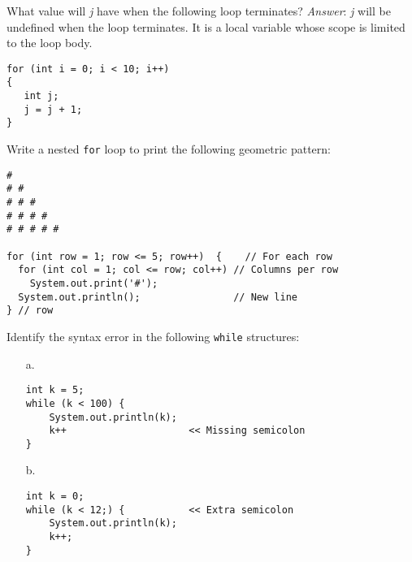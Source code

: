 \begin{ANS}
\item  What value will {\it j} have when the following loop terminates?
{\it Answer}: {\it j} will be undefined when the loop terminates. It
is a local variable whose scope is limited to the loop body.

\begin{jjjlisting}
\begin{lstlisting}[basicstyle=\scriptsize]
for (int i = 0; i < 10; i++)
{
   int j;
   j = j + 1;
}
\end{lstlisting}
\end{jjjlisting}


\item  Write a nested {\tt for} loop to print the following geometric pattern:

\begin{jjjlisting}
\begin{lstlisting}[basicstyle=\scriptsize]
#
# #
# # #
# # # #
# # # # #

for (int row = 1; row <= 5; row++)  {    // For each row
  for (int col = 1; col <= row; col++) // Columns per row
    System.out.print('#');
  System.out.println();                // New line
} // row
\end{lstlisting}
\end{jjjlisting}

\item  Identify the syntax error in the following {\tt while} structures:
\begin{enumerate}\baselineskip=10.5pt

\item[a.]

\begin{jjjlisting}
\begin{lstlisting}[basicstyle=\scriptsize]
int k = 5;
while (k < 100) {
    System.out.println(k);
    k++                     << Missing semicolon
}
\end{lstlisting}
\end{jjjlisting}

\item[b.]

\begin{jjjlisting}
\begin{lstlisting}[basicstyle=\scriptsize]
int k = 0;
while (k < 12;) {           << Extra semicolon
    System.out.println(k);
    k++;
}
\end{lstlisting}
\end{jjjlisting}

\end{enumerate}



\end{ANS}
